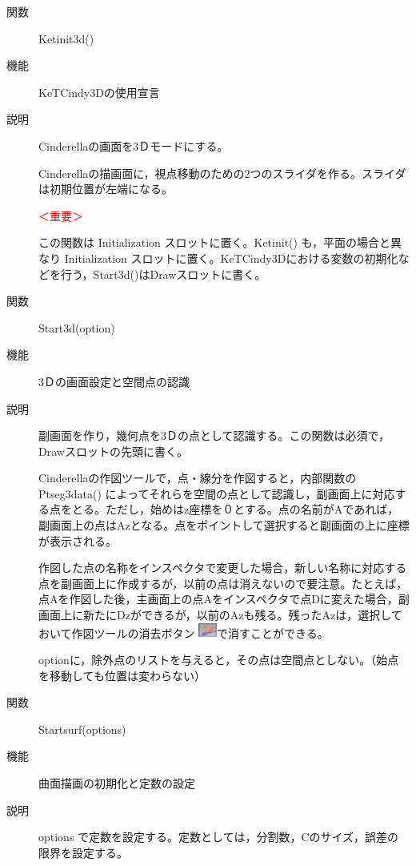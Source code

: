 \documentclass[papersize,a4paper,12pt,uplatex]{jsarticle}
\begin{document}
\begin{description}

\hypertarget{ketinit3d}{}
\item[関数]  Ketinit3d()
\item[機能]  KeTCindy3Dの使用宣言
\item[説明]  Cinderellaの画面を3Ｄモードにする。

Cinderellaの描画面に，視点移動のための2つのスライダを作る。スライダは初期位置が左端になる。

\textcolor{red}{＜重要＞}

  この関数は Initialization スロットに置く。Ketinit() も，平面の場合と異なり Initialization スロットに置く。KeTCindy3Dにおける変数の初期化などを行う，Start3d()はDrawスロットに書く。
  
\vspace{\baselineskip}
\hypertarget{start3d}{}
\item[関数]  Start3d(option)
\item[機能]  3Ｄの画面設定と空間点の認識
\item[説明]  副画面を作り，幾何点を3Ｄの点として認識する。この関数は必須で，Drawスロットの先頭に書く。

Cinderellaの作図ツールで，点・線分を作図すると，内部関数の Ptseg3data() によってそれらを空間の点として認識し，副画面上に対応する点をとる。ただし，始めはz座標を０とする。点の名前がAであれば，副画面上の点はAzとなる。点をポイントして選択すると副画面の上に座標が表示される。

作図した点の名称をインスペクタで変更した場合，新しい名称に対応する点を副画面上に作成するが，以前の点は消えないので要注意。たとえば，点Aを作図した後，主画面上の点Aをインスペクタで点Dに変えた場合，副画面上に新たにDzができるが，以前のAzも残る。残ったAzは，選択しておいて作図ツールの消去ボタン \includegraphics[bb=0 0 6.48 5.04 , width=0.6cm]{Fig/delete.pdf}で消すことができる。

optionに，除外点のリストを与えると，その点は空間点としない。（始点を移動しても位置は変わらない）

\vspace{\baselineskip}
\hypertarget{startsurf}{}
\item[関数]  Startsurf(options)
\item[機能]  曲面描画の初期化と定数の設定
\item[説明]  options で定数を設定する。定数としては，分割数，Cのサイズ，誤差の限界を設定する。


\end{description}
\end{document}
